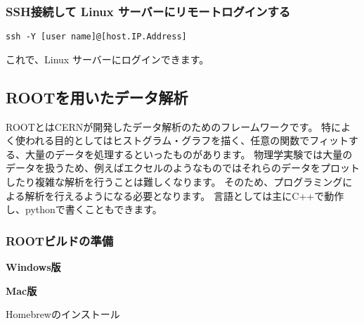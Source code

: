 \documentclass[10pt,a4j]{jarticle}
\begin{document}
\subsubsection{SSH接続して Linux サーバーにリモートログインする}
\begin{lstlisting}
ssh -Y [user name]@[host.IP.Address]
\end{lstlisting}
これで、Linux サーバーにログインできます。

\subsection{ROOTを用いたデータ解析}

ROOTとはCERNが開発したデータ解析のためのフレームワークです。
特によく使われる目的としてはヒストグラム・グラフを描く、任意の関数でフィットする、大量のデータを処理するといったものがあります。
物理学実験では大量のデータを扱うため、例えばエクセルのようなものではそれらのデータをプロットしたり複雑な解析を行うことは難しくなります。
そのため、プログラミングによる解析を行えるようになる必要となります。
言語としては主にC++で動作し、pythonで書くこともできます。

\subsubsection{ROOTビルドの準備}

\vspace{1cm}
{\Large \bf Windows版}
\vspace{0.5cm}

\vspace{1cm}
{\Large \bf Mac版}
\normalsize{}

\vspace{0.5cm}
Homebrewのインストール
\vspace{0.3cm}
\end{document}
